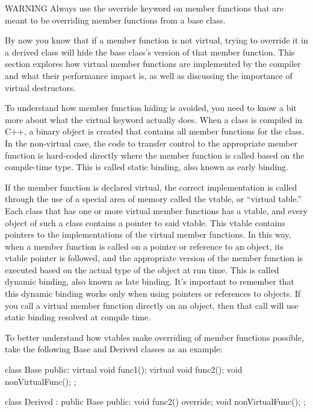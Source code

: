 \begin{myWarning}{WARNING}
Always use the override keyword on member functions that are meant to be overriding member functions from a base class.
\end{myWarning}


By now you know that if a member function is not virtual, trying to override it in a derived class will hide the base class’s version of that member function. This section explores how virtual member functions are implemented by the compiler and what their performance impact is, as well as discussing the importance of virtual destructors.


To understand how member function hiding is avoided, you need to know a bit more about what the virtual keyword actually does. When a class is compiled in C++, a binary object is created that contains all member functions for the class. In the non-virtual case, the code to transfer control to the appropriate member function is hard-coded directly where the member function is called based on the compile-time type. This is called static binding, also known as early binding.

If the member function is declared virtual, the correct implementation is called through the use of a special area of memory called the vtable, or “virtual table.” Each class that has one or more virtual member functions has a vtable, and every object of such a class contains a pointer to said vtable. This vtable contains pointers to the implementations of the virtual member functions. In this way, when a member function is called on a pointer or reference to an object, its vtable pointer is followed, and the appropriate version of the member function is executed based on the actual type of the object at run time. This is called dynamic binding, also known as late binding. It’s important to remember that this dynamic binding works only when using pointers or references to objects. If you call a virtual member function directly on an object, then that call will use static binding resolved at compile time.

To better understand how vtables make overriding of member functions possible, take the following Base and Derived classes as an example:

\begin{cpp}
class Base
{
    public:
        virtual void func1();
        virtual void func2();
        void nonVirtualFunc();
};

class Derived : public Base
{
    public:
        void func2() override;
        void nonVirtualFunc();
};
\end{cpp}

